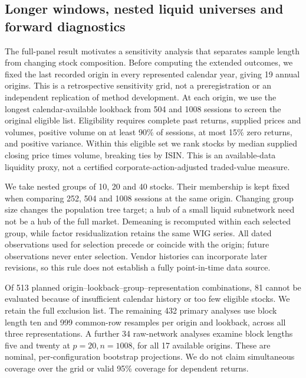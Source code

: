 \subsection{Longer windows, nested liquid universes and forward diagnostics}\label{sec:extended}
The full-panel result motivates a sensitivity analysis that separates sample length from changing stock composition. Before computing the extended outcomes, we fixed the last recorded origin in every represented calendar year, giving 19 annual origins. This is a retrospective sensitivity grid, not a preregistration or an independent replication of method development. At each origin, we use the longest calendar-available lookback from 504 and 1008 sessions to screen the original eligible list. Eligibility requires complete past returns, supplied prices and volumes, positive volume on at least 90\% of sessions, at most 15\% zero returns, and positive variance. Within this eligible set we rank stocks by median supplied closing price times volume, breaking ties by ISIN. This is an available-data liquidity proxy, not a certified corporate-action-adjusted traded-value measure.

We take nested groups of 10, 20 and 40 stocks. Their membership is kept fixed when comparing 252, 504 and 1008 sessions at the same origin. Changing group size changes the population tree target; a hub of a small liquid subnetwork need not be a hub of the full market. Demeaning is recomputed within each selected group, while factor residualization retains the same WIG series. All dated observations used for selection precede or coincide with the origin; future observations never enter selection. Vendor histories can incorporate later revisions, so this rule does not establish a fully point-in-time data source.

Of 513 planned origin--lookback--group--representation combinations, 81 cannot be evaluated because of insufficient calendar history or too few eligible stocks. We retain the full exclusion list. The remaining 432 primary analyses use block length ten and 999 common-row resamples per origin and lookback, across all three representations. A further 34 raw-network analyses examine block lengths five and twenty at $p=20,n=1008$, for all 17 available origins. These are nominal, per-configuration bootstrap projections. We do not claim simultaneous coverage over the grid or valid 95\% coverage for dependent returns.

